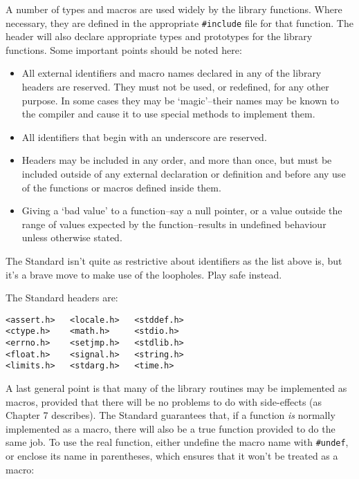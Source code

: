    A number of types and macros are used widely by the library
    functions.  Where necessary, they are defined in the
    appropriate \texttt{\#include} file for that function.  The header
    will also declare appropriate types and prototypes for the
    library functions.  Some important points should be noted
    here:


   \begin{itemize}
    \item All external identifiers and macro names declared in any
     of the library headers are reserved.  They must not be
     used, or redefined, for any other purpose.  In some cases
     they may be `magic'--their names may be known to the
     compiler and cause it to use special methods to implement
     them.

    \item All identifiers that begin with an underscore are
     reserved.

    \item Headers may be included in any order, and more than once,
     but must be included outside of any external declaration
     or definition and before any use of the functions or
     macros defined inside them.

    \item Giving a `bad value' to a function--say a null pointer,
     or a value outside the range of values expected by the
     function--results in undefined behaviour unless
     otherwise stated.
   \end{itemize}

   The Standard isn't quite as restrictive about identifiers as
    the list above is, but it's a brave move to make use of the
    loopholes.  Play safe instead.


   The Standard headers are:


   \begin{Verbatim}
<assert.h>   <locale.h>   <stddef.h>
<ctype.h>    <math.h>     <stdio.h>
<errno.h>    <setjmp.h>   <stdlib.h>
<float.h>    <signal.h>   <string.h>
<limits.h>   <stdarg.h>   <time.h>
\end{Verbatim}

   A last general point is that many of  the  library  routines
    may be implemented as macros, provided that there will be no
    problems to do with side-effects (as Chapter 7 describes).
    The  Standard  guarantees  that,  if  a function \textit{is} normally
    implemented as a macro, there will also be a  true  function
    provided  to  do  the  same  job.  To use the real function,
    either undefine the macro name with \texttt{\#undef}, or  enclose  its
    name  in parentheses, which ensures that it won't be treated
    as a macro:


